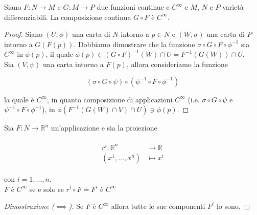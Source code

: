 \begin{definition}
	Siano $ F : N \to M $ e $ G : M \to P $ due funzioni continue e $ C^{\infty} $ e $ M $, $ N $ e $ P $ varietà differenziabili. La composizione continua $ G \circ F $ è $ C^{\infty} $.
\end{definition}

\begin{proof}
	Siano $ (U,\phi) $ una carta di $ N $ intorno a $ p \in N $ e $ (W,\sigma) $ una carta di $ P $ intorno a $ G(F(p)) $. Dobbiamo dimostrare che la funzione $ \sigma \circ G \circ F \circ \phi^{-1} $ sia $ C^{\infty} $ in $ \phi(p) $, il quale $ \phi(p) \in (G \circ F)^{-1}(W) \cap U = F^{-1}(G(W)) \cap U $.\\
	Sia $ (V,\psi) $ una carta intorno a $ F(p) $, allora consideriamo la funzione
	
	\begin{equation}
		(\sigma \circ G \circ \psi) \circ (\psi^{-1} \circ F \circ \phi^{-1})
	\end{equation}

	la quale è $ C^{\infty} $, in quanto composizione di applicazioni $ C^{\infty} $ (i.e. $ \sigma \circ G \circ \psi $ e $ \psi^{-1} \circ F \circ \phi^{-1} $), in $ \phi(F^{-1}(G(W) \cap V) \cap U) \ni \phi(p) $.
\end{proof}

\begin{definition}[Componenti]
	Sia $ F : N \to \mathbb{R}^{n} $ un'applicazione e sia la proiezione
	
	\begin{align}
		\begin{split}
			r^{i} : \mathbb{R}^{n} &\to \mathbb{R}\\
			(x^{1},\dots,x^{n}) &\mapsto x^{i}
		\end{split}
	\end{align}

	con $ i=1,\dots,n $.\\
	$ F $ è $ C^{\infty} $ se e solo se $ r^{i} \circ F \doteq F^{i} $ è $ C^{\infty} $
\end{definition}

\begin{proof}[Dimostrazione ($ \implies $)]
	Se $ F $ è $ C^{\infty} $ allora tutte le sue componenti $ F^{i} $ lo sono.
\end{proof}

